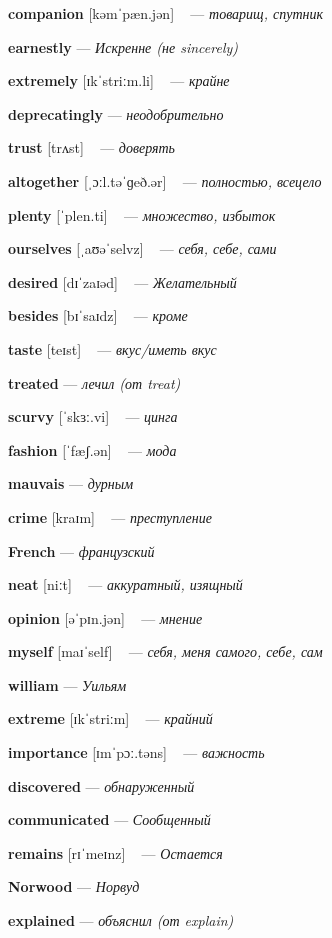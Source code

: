 \documentclass[a4paper,oneside,12pt]{amsart}
\begin{document}
{\large 

 {\bf companion } [kəmˈpæn.jən] ~ --- \emph{ товарищ, спутник }

{\bf earnestly } --- \emph{ Искренне (не sincerely) }

{\bf extremely } [ɪkˈstriːm.li] ~ --- \emph{ крайне }

{\bf deprecatingly } --- \emph{ неодобрительно }

{\bf trust } [trʌst] ~ --- \emph{ доверять }

{\bf altogether } [ˌɔːl.təˈɡeð.ər] ~ --- \emph{ полностью, всецело }

{\bf plenty } [ˈplen.ti] ~ --- \emph{ множество, избыток }

{\bf ourselves } [ˌaʊəˈselvz] ~ --- \emph{ себя, себе, сами }

{\bf desired } [dɪˈzaɪəd] ~ --- \emph{ Желательный }

{\bf besides } [bɪˈsaɪdz] ~ --- \emph{ кроме }

{\bf taste } [teɪst] ~ --- \emph{ вкус/иметь вкус }

{\bf treated } --- \emph{ лечил (от treat) }

{\bf scurvy } [ˈskɜː.vi] ~ --- \emph{ цинга }

{\bf fashion } [ˈfæʃ.ən] ~ --- \emph{ мода }

{\bf mauvais } --- \emph{ дурным }

{\bf crime } [kraɪm] ~ --- \emph{ преступление }

{\bf French } --- \emph{ французский }

{\bf neat } [niːt] ~ --- \emph{ аккуратный, изящный }

{\bf opinion } [əˈpɪn.jən] ~ --- \emph{ мнение }

{\bf myself } [maɪˈself] ~ --- \emph{ себя, меня самого, себе, сам }

{\bf william } --- \emph{ Уильям }

{\bf extreme } [ɪkˈstriːm] ~ --- \emph{ крайний }

{\bf importance } [ɪmˈpɔː.təns] ~ --- \emph{ важность }

{\bf discovered } --- \emph{ обнаруженный }

{\bf communicated } --- \emph{ Сообщенный }

{\bf remains } [rɪˈmeɪnz] ~ --- \emph{ Остается }

{\bf Norwood } --- \emph{ Норвуд }

{\bf explained } --- \emph{ объяснил (от explain) }

}
\end{document}
